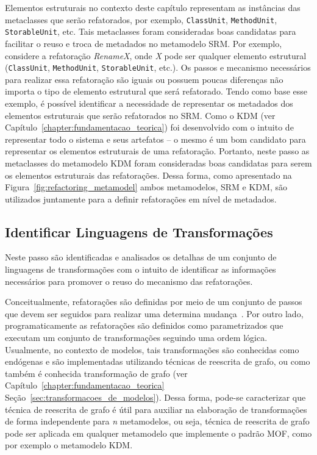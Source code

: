 Elementos estruturais no contexto deste capítulo representam as instâncias das metaclasses que serão refatorados, por exemplo, \texttt{ClassUnit}, \texttt{MethodUnit}, \texttt{StorableUnit}, etc. Tais metaclasses foram consideradas boas candidatas para facilitar o reuso e troca de metadados no metamodelo SRM. Por exemplo, considere a refatoração \textit{RenameX}, onde \textit{X} pode ser qualquer elemento estrutural (\texttt{ClassUnit}, \texttt{MethodUnit}, \texttt{StorableUnit}, etc.). Os passos e mecanismo necessários para realizar essa refatoração são iguais ou possuem poucas diferenças não importa o tipo de elemento estrutural que será refatorado. Tendo como base esse exemplo, é possível identificar a necessidade de representar os metadados dos elementos estruturais que serão refatorados no SRM. Como o KDM (ver Capítulo~\ref{chapter:fundamentacao_teorica}) foi desenvolvido com o intuito de representar todo o sistema e seus artefatos – o mesmo é um bom candidato para representar os elementos estruturais de uma refatoração. Portanto, neste passo as metaclasses do metamodelo KDM foram consideradas boas candidatas para serem os elementos estruturais das refatorações. Dessa forma, como apresentado na Figura~\ref{fig:refactoring_metamodel} ambos metamodelos, SRM e KDM, são utilizados juntamente para a definir refatorações em nível de metadados.

\subsection{Identificar Linguagens de Transformações}

Neste passo são identificadas e analisados os detalhas de um conjunto de linguagens de transformações com o intuito de identificar as informações necessários para promover o reuso do mecanismo das refatorações. 

Conceitualmente, refatorações são definidas por meio de um conjunto de passos que devem ser seguidos para realizar uma determina mudança~\cite{Fowler1999, Demeyer1}. Por outro lado, programaticamente as refatorações são definidos como  parametrizados que executam um conjunto de transformações seguindo uma ordem lógica. Usualmente, no contexto de modelos, tais transformações são conhecidas como endógenas e são implementadas utilizando técnicas de reescrita de grafo, ou como também é conhecida transformação de grafo (ver Capítulo~\ref{chapter:fundamentacao_teorica} Seção~\ref{sec:transformacoes_de_modelos}). Dessa forma, pode-se caracterizar que técnica de reescrita de grafo é útil para auxiliar na elaboração de transformações de forma independente para \textit{n} metamodelos, ou seja, técnica de reescrita de grafo pode ser aplicada em qualquer metamodelo que implemente o padrão MOF, como por exemplo o metamodelo KDM. 

